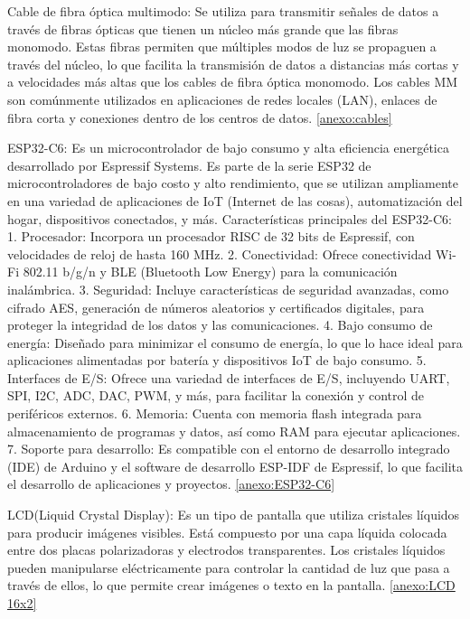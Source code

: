      Cable de fibra óptica multimodo: Se utiliza para transmitir señales de datos a través de fibras ópticas que tienen un núcleo más grande que las fibras monomodo. Estas fibras permiten que múltiples modos de luz se propaguen a través del núcleo, lo que facilita la transmisión de datos a distancias más cortas y a velocidades más altas que los cables de fibra óptica monomodo. Los cables MM son comúnmente utilizados en aplicaciones de redes locales (LAN), enlaces de fibra corta y conexiones dentro de los centros de datos.
    \ref{anexo:cables}
    
    ESP32-C6: Es un microcontrolador de bajo consumo y alta eficiencia energética desarrollado por Espressif Systems. Es parte de la serie ESP32 de microcontroladores de bajo costo y alto rendimiento, que se utilizan ampliamente en una variedad de aplicaciones de IoT (Internet de las cosas), automatización del hogar, dispositivos conectados, y más.
    Características principales del ESP32-C6:
    1.	Procesador: Incorpora un procesador RISC de 32 bits de Espressif, con velocidades de reloj de hasta 160 MHz.
    2.	Conectividad: Ofrece conectividad Wi-Fi 802.11 b/g/n y BLE (Bluetooth Low Energy) para la comunicación inalámbrica.
    3.	Seguridad: Incluye características de seguridad avanzadas, como cifrado AES, generación de números aleatorios y certificados digitales, para proteger la integridad de los datos y las comunicaciones.
    4.	Bajo consumo de energía: Diseñado para minimizar el consumo de energía, lo que lo hace ideal para aplicaciones alimentadas por batería y dispositivos IoT de bajo consumo.
    5.	Interfaces de E/S: Ofrece una variedad de interfaces de E/S, incluyendo UART, SPI, I2C, ADC, DAC, PWM, y más, para facilitar la conexión y control de periféricos externos.
    6.	Memoria: Cuenta con memoria flash integrada para almacenamiento de programas y datos, así como RAM para ejecutar aplicaciones.
    7.	Soporte para desarrollo: Es compatible con el entorno de desarrollo integrado (IDE) de Arduino y el software de desarrollo ESP-IDF de Espressif, lo que facilita el desarrollo de aplicaciones y proyectos.
    \ref{anexo:ESP32-C6}
    
    LCD(Liquid Crystal Display): Es un tipo de pantalla que utiliza cristales líquidos para producir imágenes visibles. Está compuesto por una capa líquida colocada entre dos placas polarizadoras y electrodos transparentes. Los cristales líquidos pueden manipularse eléctricamente para controlar la cantidad de luz que pasa a través de ellos, lo que permite crear imágenes o texto en la pantalla.
    \ref{anexo:LCD 16x2}
    

